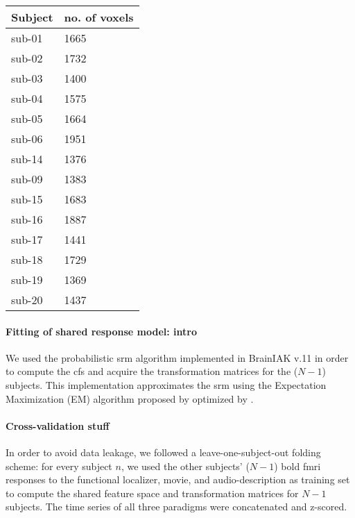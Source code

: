 \begin{table*}[btp]
    \caption{Number of remaining voxels after time series data of each paradigm
    and subject were masked with the union of individual \acp{ppa} that was
    warped from MNI space into each individual's subjects-space and the
    subject-specific field of view of audio-description.}

\label{tab:ppamaskvoxels}
\begin{tabular}{ll}
\toprule
\textbf{Subject} & \textbf{no. of voxels} \\
\midrule
sub-01 & 1665 \tabularnewline
sub-02 & 1732 \tabularnewline
sub-03 & 1400 \tabularnewline
sub-04 & 1575 \tabularnewline
sub-05 & 1664 \tabularnewline
sub-06 & 1951 \tabularnewline
sub-14 & 1376 \tabularnewline
sub-09 & 1383 \tabularnewline
sub-15 & 1683 \tabularnewline
sub-16 & 1887 \tabularnewline
sub-17 & 1441 \tabularnewline
sub-18 & 1729 \tabularnewline
sub-19 & 1369 \tabularnewline
sub-20 & 1437 \tabularnewline
\bottomrule
\end{tabular}
\end{table*}


\paragraph{Fitting of shared response model: intro}


We used the probabilistic \ac{srm} algorithm implemented in BrainIAK v.11
\citep[Brain Imaging Analysis Kit;][]{kumar2020brainiak,
kumar2020brainiaktutorial} in order to compute the \ac{cfs} and
acquire the transformation matrices for the ($N-1$) subjects.
%
This implementation approximates the \ac{srm} using the Expectation Maximization
(EM) algorithm proposed by \citep{chen2015reduced} optimized by
\citet{anderson2016enabling}.


\paragraph{Cross-validation stuff}


%
In order to avoid data leakage, we followed a leave-one-subject-out folding
scheme:
%
for every subject $n$, we used the other subjects' ($N-1$) \ac{bold} \ac{fmri}
responses to the functional localizer, movie, and audio-description as training
set to compute the shared feature space and transformation matrices for $N-1$
subjects.
The time series of all three paradigms were concatenated and z-scored.

